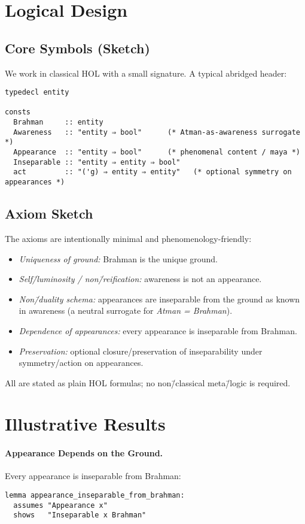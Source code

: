 \documentclass[11pt,a4paper]{article}
\begin{document}
\section{Logical Design}

\subsection{Core Symbols (Sketch)}

We work in classical HOL with a small signature. A typical abridged header:
\begin{lstlisting}
typedecl entity

consts
  Brahman     :: entity
  Awareness   :: "entity ⇒ bool"      (* Atman-as-awareness surrogate *)
  Appearance  :: "entity ⇒ bool"      (* phenomenal content / maya *)
  Inseparable :: "entity ⇒ entity ⇒ bool"
  act         :: "('g) ⇒ entity ⇒ entity"   (* optional symmetry on appearances *)
\end{lstlisting}

\subsection{Axiom Sketch}

The axioms are intentionally minimal and phenomenology-friendly:
\begin{itemize}
  \item \emph{Uniqueness of ground:} Brahman is the unique ground.
  \item \emph{Self\=/luminosity / non\=/reification:} awareness is not an appearance.
  \item \emph{Non\=/duality schema:} appearances are inseparable from the ground
        as known in awareness (a neutral surrogate for \emph{Atman = Brahman}).
  \item \emph{Dependence of appearances:} every appearance is inseparable from
        Brahman.
  \item \emph{Preservation:} optional closure/preservation of inseparability
        under symmetry/action on appearances.
\end{itemize}
All are stated as plain HOL formulas; no non\=/classical meta\=/logic is required.

\section{Illustrative Results}

\paragraph{Appearance Depends on the Ground.}
Every appearance is inseparable from Brahman:
\begin{lstlisting}
lemma appearance_inseparable_from_brahman:
  assumes "Appearance x"
  shows   "Inseparable x Brahman"
\end{lstlisting}
\end{document}
